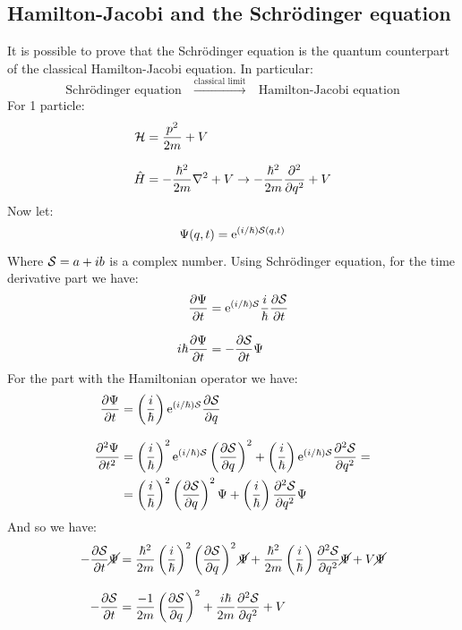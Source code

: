 \subsection{Hamilton-Jacobi and the Schrödinger equation}
It is possible to prove that the Schrödinger equation is the quantum counterpart of the classical Hamilton-Jacobi equation. In particular:
\begin{equation}
  \text{Schrödinger equation} \quad \xrightarrow{\text{classical limit}} \quad \text{Hamilton-Jacobi equation}
\end{equation}
For 1 particle:
\begin{equation}
  \begin{split}
    \hamfun &= \dfrac{p^2}{2m} + V\\[8pt]
    \hat{H} &= -\dfrac{\hbar^2}{2m} \lap + V \rightarrow -\dfrac{\hbar^2}{2m} \pdv[2]{}{q} + V
  \end{split}
\end{equation}
Now let:
\begin{equation}
  \Psi(q,t) = \mathrm{e}^{(i/ \hbar) \mathcal{S}(q,t)}
\end{equation}
Where $\mathcal{S} = a + ib$ is a complex number. Using Schrödinger equation, for the time derivative part we have:
\begin{equation}
  \begin{split}
    \pdv{\Psi}{t} &= \efunction^{(i/ \hbar) \action} \dfrac{i}{\hbar}\pdv{\action}{t}\\[8pt]
    i\hbar\pdv{\Psi}{t} &= -\pdv{\action}{t} \Psi
  \end{split}
\end{equation}
For the part with the Hamiltonian operator we have:
\begin{equation}
  \begin{split}
    \pdv{\Psi}{t} &= \brackets{\dfrac{i}{\hbar}}\efunction^{(i/ \hbar) \action} \pdv{\action}{q}\\[8pt]
    \pdv[2]{\Psi}{t} &= \brackets{\dfrac{i}{\hbar}}^2\efunction^{(i/ \hbar) \action}\brackets{\pdv{\action}{q}}^2 + \brackets{\dfrac{i}{\hbar}}\efunction^{(i/ \hbar) \action} \pdv[2]{\action}{q}=\\
    &= \brackets{\dfrac{i}{\hbar}}^2\brackets{\pdv{\action}{q}}^2 \Psi + \brackets{\dfrac{i}{\hbar}}\pdv[2]{\action}{q} \Psi
  \end{split}
\end{equation}
And so we have:
\begin{equation}
  \begin{split}
    -\pdv{\action}{t} \cancel{\Psi} &= \dfrac{\hbar^2}{2m}\brackets{\dfrac{i}{\hbar}}^2\brackets{\pdv{\action}{q}}^2 \cancel{\Psi} + \dfrac{\hbar^2}{2m}\brackets{\dfrac{i}{\hbar}}\pdv[2]{\action}{q} \cancel{\Psi} + V\cancel{\Psi}\\[8pt]
    -\pdv{\action}{t} &= \dfrac{-1}{2m}\brackets{\pdv{\action}{q}}^2  + \dfrac{i\hbar}{2m}\pdv[2]{\action}{q} + V
  \end{split}
\end{equation}
